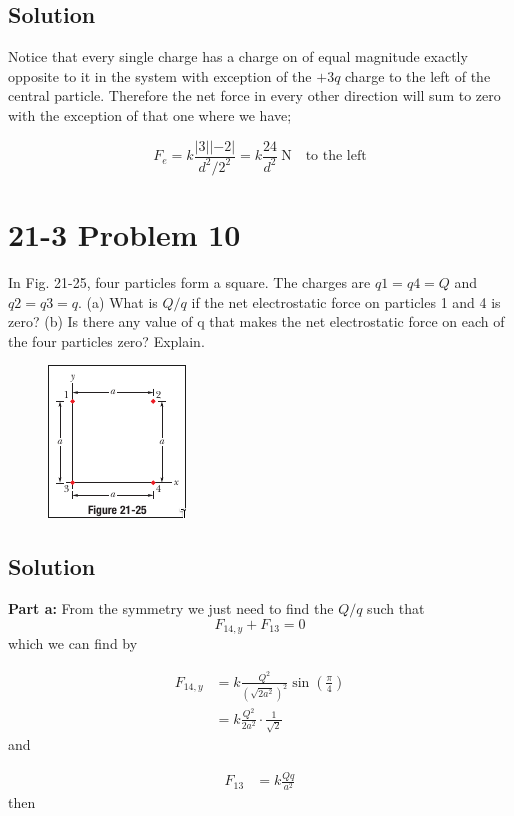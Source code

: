 \documentclass{article}
\begin{document}
\subsection*{Solution}
Notice that every single charge has a charge on of equal magnitude exactly opposite to it in the system with exception of the $+3q$ charge to the left of the central particle.
Therefore the net force in every other direction will sum to zero with the exception of that one where we have;

\[
	F_e = k \frac{|3||-2|}{d^2/2^2} = \boxed{k \frac{24}{d^2}\ \text{N} \quad \text{to the left}}
\]

\section*{21-3 Problem 10}
In Fig. 21-25, four particles form a square. The charges are $q1 = q4 = Q$ and $q2 = q3 = q$.
(a) What is $Q/q$ if the net electrostatic force on particles 1 and 4 is zero?
(b) Is there any value of q that makes the net electrostatic force on each of the four particles zero? Explain.

\begin{figure}[ht]
    \centering
    \includegraphics[scale=0.75]{image-4.png}
\end{figure}

\subsection*{Solution}
\textbf{Part a:} From the symmetry we just need to find the $Q/q$ such that
\[
    F_{14,y} + F_{13} = 0
\]
which we can find by

\begin{align*}
    F_{14,y} &= k \frac{Q^2}{\left(\sqrt{2a^2}\right)^2} \sin\left(\frac{\pi}{4}\right)\\
    &= k \frac{Q^2}{2a^2} \cdot \frac{1}{\sqrt{2}}
\end{align*}
and

\begin{align*}
    F_{13} &= k \frac{Qq}{a^2}
\end{align*}
then
\end{document}

